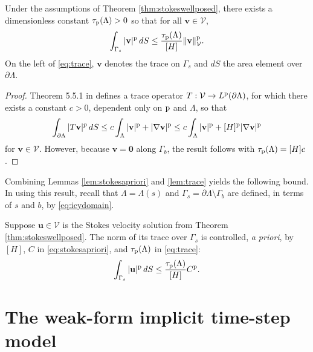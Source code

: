\documentclass[hidelinks,onefignum,onetabnum,final]{siamart220329}  %
\newcommand{\grad}{\nabla}
\newcommand{\bu}{\mathbf{u}}
\newcommand{\bv}{\mathbf{v}}
\newcommand{\bzero}{\bm{0}}
\newcommand{\cV}{\mathcal{V}}
\newcommand{\pp}{{\text{\textnormal{p}}}}
\begin{document}
\begin{lemma} \label{lem:trace}
Under the assumptions of Theorem \ref{thm:stokeswellposed}, there exists a dimensionless constant $\tau_{\pp}(\Lambda)>0$ so that for all $\bv \in \cV$,
\begin{equation}
\int_{\Gamma_s} |\bv|^\pp \,dS \le \frac{\tau_{\pp}(\Lambda)}{[H]} \|\bv\|_{\cV}^\pp. \label{eq:trace}
\end{equation}
On the left of \eqref{eq:trace}, $\bv$ denotes the trace on $\Gamma_s$ and $dS$ the area element over $\partial\Lambda$.
\end{lemma}

\begin{proof}
Theorem 5.5.1 in \cite{Evans2010} defines a trace operator $T:\cV\to L^\pp(\partial\Lambda)$, for which there exists a constant $c>0$, dependent only on $\pp$ and $\Lambda$, so that
\begin{equation}
\int_{\partial\Lambda} |T\bv|^p\,dS \le c \int_{\Lambda} |\bv|^\pp + |\grad\bv|^\pp \le c \int_{\Lambda} |\bv|^\pp + [H]^\pp |\grad\bv|^\pp \label{eq:tracework}
\end{equation}
for $\bv\in\cV$.  However, because $\bv=\bzero$ along $\Gamma_b$, the result follows with $\tau_{\pp}(\Lambda)=[H] c$.
\end{proof}

Combining Lemmas \ref{lem:stokesapriori} and \ref{lem:trace} yields the following bound.  In using this result, recall that $\Lambda=\Lambda(s)$ and $\Gamma_s=\partial \Lambda\setminus \Gamma_b$ are defined, in terms of $s$ and $b$, by \eqref{eq:icydomain}.

\begin{corollary} \label{cor:surfacetracebound}
Suppose $\bu\in\cV$ is the Stokes velocity solution from Theorem \ref{thm:stokeswellposed}.  The norm of its trace over $\Gamma_s$ is controlled, \emph{a priori}, by $[H]$, $C$ in \eqref{eq:stokesapriori}, and $\tau_{\pp}(\Lambda)$ in \eqref{eq:trace}:
\begin{equation}
\int_{\Gamma_s} |\bu|^\pp \,dS \le \frac{\tau_{\pp}(\Lambda)}{[H]} C^\pp. \label{eq:surfacetracebound}
\end{equation}
\end{corollary}


\section{The weak-form implicit time-step model} \label{sec:model}
\end{document}
